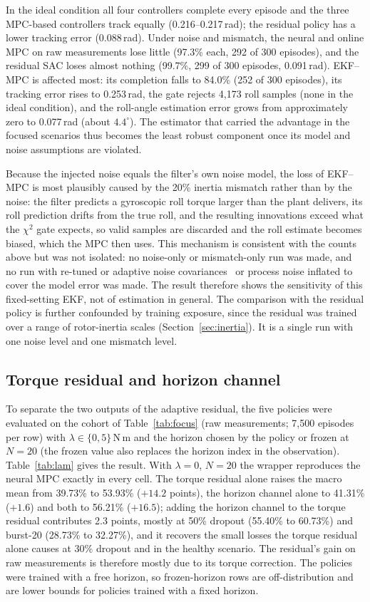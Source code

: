 \documentclass[preprint,12pt,authoryear=false]{elsarticle}
\theoremstyle{remark}\newtheorem{remark}{Remark}
\theoremstyle{plain}\newtheorem{proposition}{Proposition}\newtheorem{lemma}{Lemma}
\theoremstyle{definition}\newtheorem{assumption}{Assumption}
\newcommand{\Nm}{\,\mathrm{N\,m}}
\begin{document}
In the ideal condition all four controllers complete every episode and the three MPC-based controllers track equally (0.216--0.217\,rad); the residual policy has a lower tracking error (0.088\,rad). Under noise and mismatch, the neural and online MPC on raw measurements lose little (97.3\% each, 292 of 300 episodes), and the residual SAC loses almost nothing (99.7\%, 299 of 300 episodes, 0.091\,rad). EKF--MPC is affected most: its completion falls to 84.0\% (252 of 300 episodes), its tracking error rises to 0.253\,rad, the gate rejects 4{,}173 roll samples (none in the ideal condition), and the roll-angle estimation error grows from approximately zero to 0.077\,rad (about $4.4^\circ$). The estimator that carried the advantage in the focused scenarios thus becomes the least robust component once its model and noise assumptions are violated.

Because the injected noise equals the filter's own noise model, the loss of EKF--MPC is most plausibly caused by the 20\% inertia mismatch rather than by the noise: the filter predicts a gyroscopic roll torque larger than the plant delivers, its roll prediction drifts from the true roll, and the resulting innovations exceed what the $\chi^2$ gate expects, so valid samples are discarded and the roll estimate becomes biased, which the MPC then uses. This mechanism is consistent with the counts above but was not isolated: no noise-only or mismatch-only run was made, and no run with re-tuned or adaptive noise covariances~\cite{mehra1970identification} or process noise inflated to cover the model error was made. The result therefore shows the sensitivity of this fixed-setting EKF, not of estimation in general. The comparison with the residual policy is further confounded by training exposure, since the residual was trained over a range of rotor-inertia scales (Section~\ref{sec:inertia}). It is a single run with one noise level and one mismatch level.

\subsection{Torque residual and horizon channel}\label{sec:lambda}
To separate the two outputs of the adaptive residual, the five policies were evaluated on the cohort of Table~\ref{tab:focus} (raw measurements; 7{,}500 episodes per row) with $\lambda\in\{0,5\}\Nm$ and the horizon chosen by the policy or frozen at $N=20$ (the frozen value also replaces the horizon index in the observation). Table~\ref{tab:lam} gives the result. With $\lambda=0$, $N=20$ the wrapper reproduces the neural MPC exactly in every cell. The torque residual alone raises the macro mean from 39.73\% to 53.93\% ($+14.2$ points), the horizon channel alone to 41.31\% ($+1.6$) and both to 56.21\% ($+16.5$); adding the horizon channel to the torque residual contributes 2.3 points, mostly at 50\% dropout (55.40\% to 60.73\%) and burst-20 (28.73\% to 32.27\%), and it recovers the small losses the torque residual alone causes at 30\% dropout and in the healthy scenario. The residual's gain on raw measurements is therefore mostly due to its torque correction. The policies were trained with a free horizon, so frozen-horizon rows are off-distribution and are lower bounds for policies trained with a fixed horizon.
\end{document}
